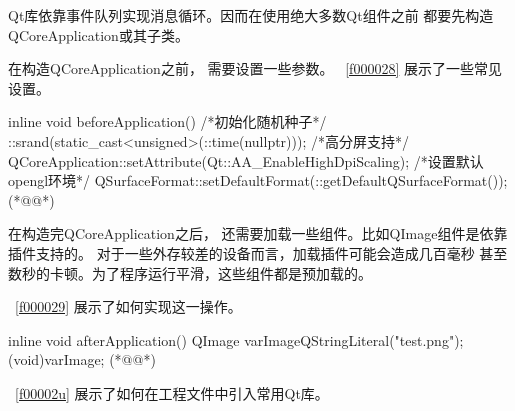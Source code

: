 Qt库依靠事件队列实现消息循环。因而在使用绝大多数Qt组件之前
都要先构造QCoreApplication或其子类。

在构造QCoreApplication之前，
需要设置一些参数。
\lstlistingname\ \ref{f000028}
展示了一些常见设置。

\FloatBarrier
\begin{thebookfilesourceone}[escapeinside={(*@}{@*)},
label=f000028,
caption=GoodLuck,
title=\lstlistingname \thelstlisting
,firstnumber=39]
inline void beforeApplication() {
    {
        /*初始化随机种子*/
        ::srand(static_cast<unsigned>(::time(nullptr)));
    }
    {
        /*高分屏支持*/
        QCoreApplication::setAttribute(Qt::AA_EnableHighDpiScaling);
    }
    {
        /*设置默认opengl环境*/
        QSurfaceFormat::setDefaultFormat(::getDefaultQSurfaceFormat());
    }
}(*@\marginpar[\hfill\setlength\fboxsep{2pt}\fbox{\footnotesize{\kaishu\parbox{1em}{\setlength{\baselineskip}{2pt}\lstlistingname}}\footnotesize{\thelstlisting}}]{\setlength\fboxsep{2pt}\fbox{\footnotesize{\kaishu\parbox{1em}{\setlength{\baselineskip}{2pt}\lstlistingname}}\footnotesize{\thelstlisting}}}@*)\end{thebookfilesourceone}          %

在构造完QCoreApplication之后，
还需要加载一些组件。比如QImage组件是依靠插件支持的。
对于一些外存较差的设备而言，加载插件可能会造成几百毫秒
甚至数秒的卡顿。为了程序运行平滑，这些组件都是预加载的。

\lstlistingname\ \ref{f000029}
展示了如何实现这一操作。

\FloatBarrier
\begin{thebookfilesourceone}[escapeinside={(*@}{@*)},
label=f000029,
caption=GoodLuck,
title=\lstlistingname \thelstlisting
,firstnumber=54]
inline void afterApplication() {
    {
        QImage varImage{QStringLiteral("test.png")};
        (void)varImage;
    }
}(*@\marginpar[\hfill\setlength\fboxsep{2pt}\fbox{\footnotesize{\kaishu\parbox{1em}{\setlength{\baselineskip}{2pt}\lstlistingname}}\footnotesize{\thelstlisting}}]{\setlength\fboxsep{2pt}\fbox{\footnotesize{\kaishu\parbox{1em}{\setlength{\baselineskip}{2pt}\lstlistingname}}\footnotesize{\thelstlisting}}}@*)\end{thebookfilesourceone}          %

\lstlistingname\ \ref{f00002u}
展示了如何在工程文件中引入常用Qt库。

